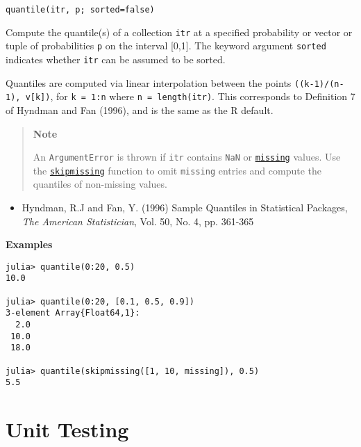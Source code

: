 \begin{adjustwidth}{2em}{0pt}


\begin{verbatim}
quantile(itr, p; sorted=false)
\end{verbatim}

Compute the quantile(s) of a collection \texttt{itr} at a specified probability or vector or tuple of probabilities \texttt{p} on the interval [0,1]. The keyword argument \texttt{sorted} indicates whether \texttt{itr} can be assumed to be sorted.

Quantiles are computed via linear interpolation between the points \texttt{((k-1)/(n-1), v[k])}, for \texttt{k = 1:n} where \texttt{n = length(itr)}. This corresponds to Definition 7 of Hyndman and Fan (1996), and is the same as the R default.

\begin{quote}
\textbf{Note}

An \texttt{ArgumentError} is thrown if \texttt{itr} contains \texttt{NaN} or \hyperlink{14596725676261444434}{\texttt{missing}} values. Use the \hyperlink{2012470681884771400}{\texttt{skipmissing}} function to omit \texttt{missing} entries and compute the quantiles of non-missing values.

\end{quote}
\begin{itemize}
\item Hyndman, R.J and Fan, Y. (1996) {\textquotedbl}Sample Quantiles in Statistical Packages{\textquotedbl}, \emph{The American Statistician}, Vol. 50, No. 4, pp. 361-365

\end{itemize}
\textbf{Examples}


\begin{verbatim}
julia> quantile(0:20, 0.5)
10.0

julia> quantile(0:20, [0.1, 0.5, 0.9])
3-element Array{Float64,1}:
  2.0
 10.0
 18.0

julia> quantile(skipmissing([1, 10, missing]), 0.5)
5.5
\end{verbatim}



\end{adjustwidth}

\hypertarget{6414110835256796083}{}


\chapter{Unit Testing}





